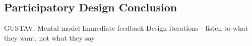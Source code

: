 \subsection{Participatory Design Conclusion}
GUSTAV. Mental model
Immediate feedback
Design iterations - listen to what they want, not what they say